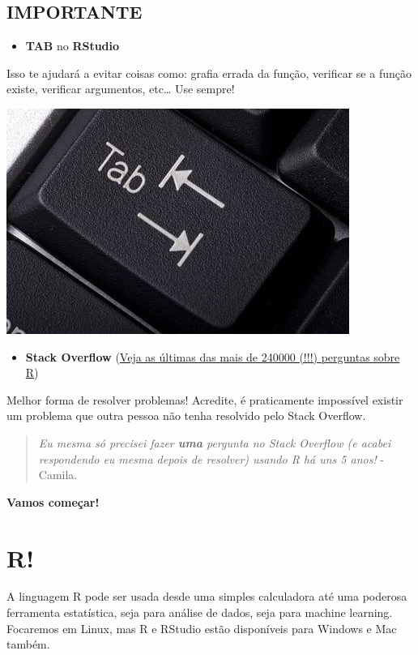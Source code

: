 \documentclass[]{book}
\providecommand{\tightlist}{%
  \setlength{\itemsep}{0pt}\setlength{\parskip}{0pt}}
\theoremstyle{definition}
\theoremstyle{definition}
\theoremstyle{definition}
\theoremstyle{remark}
\begin{document}
\section{IMPORTANTE}\label{importante}

\begin{itemize}
\tightlist
\item
  \textbf{TAB} no \textbf{RStudio}
\end{itemize}

Isso te ajudará a evitar coisas como: grafia errada da função, verificar
se a função existe, verificar argumentos, etc\ldots{} Use sempre!

\includegraphics{figuras/tab-key-.jpeg}

\begin{itemize}
\tightlist
\item
  \textbf{Stack Overflow}
  (\href{https://stackoverflow.com/questions/tagged/r}{Veja as últimas
  das mais de 240000 (!!!) perguntas sobre R})
\end{itemize}

Melhor forma de resolver problemas! Acredite, é praticamente impossível
existir um problema que outra pessoa não tenha resolvido pelo Stack
Overflow.

\begin{quote}
\emph{Eu mesma só precisei fazer \textbf{uma} pergunta no Stack Overflow
(e acabei respondendo eu mesma depois de resolver) usando R há uns 5
anos!} - Camila.
\end{quote}

\textbf{Vamos começar!}

\chapter{R!}\label{r}

A linguagem R pode ser usada desde uma simples calculadora até uma
poderosa ferramenta estatística, seja para análise de dados, seja para
machine learning. Focaremos em Linux, mas R e RStudio estão disponíveis
para Windows e Mac também.
\end{document}
